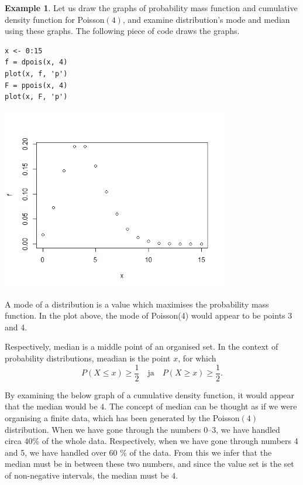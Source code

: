 \documentclass[12pt,a4paper,leqno]{report}
\theoremstyle{plain}
\theoremstyle{definition}
\newtheorem{esim}[equation]{Example}
\begin{document}
\begin{esim}
Let us draw the graphs of probability mass function and cumulative density function for Poisson$(4)$, and examine distribution's mode and median using these graphs. The following piece of code draws the graphs.
\begin{verbatim}
x <- 0:15
f = dpois(x, 4)
plot(x, f, 'p')
F = ppois(x, 4)
plot(x, F, 'p')
\end{verbatim}

\begin{center}
\includegraphics[height = 8cm]{dpois.png}
\end{center}

A mode of a distribution is a value which maximises the probability mass function. In the plot above, the mode of Poisson(4) would appear to be points 3 and 4. 

Respectively, median is a middle point of an organised set. In the context of probability distributions, meadian is the point $x$, for which
\[
P(X \leq x) \geq \frac{1}{2} \quad \text{ja} \quad P(X \geq x) \geq \frac{1}{2}.
\]

By examining the below graph of a cumulative density function, it would appear that the median would be $4$. The concept of median can be thought as if we were organising a finite data, which has been generated by the Poisson$(4)$ distribution. When we have gone through the numbers 0--3, we have handled circa 40\% of the whole data. Respectively, when we have gone through numbers 4 and 5, we have handled over 60 \% of the data. From this we infer that the median must be in between these two numbers, and since the value set is the set of non-negative intervals, the median must be $4$.


\end{esim}
\end{document}
